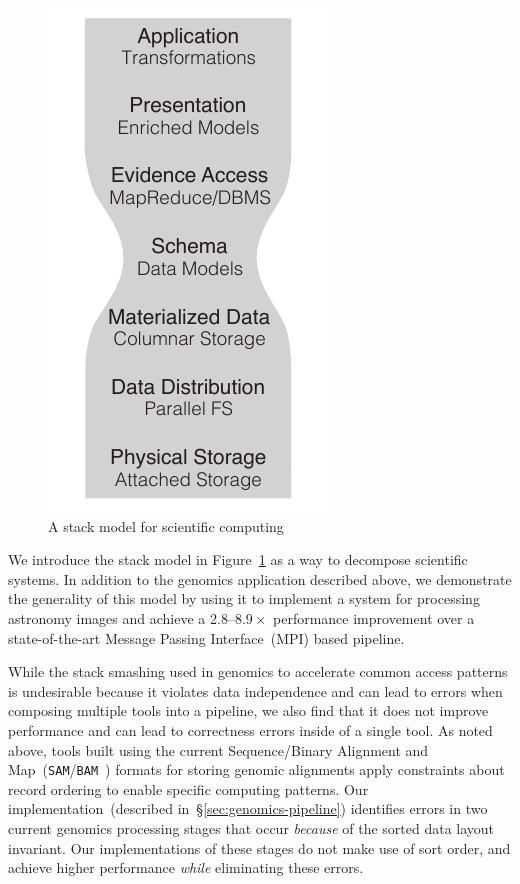 \documentclass{sig-alternate}
\begin{document}
\begin{figure}[h]
\begin{center}
\includegraphics{stack-model-2.pdf}
\end{center}
\caption{A stack model for scientific computing}
\label{fig:stack-model}
\end{figure}

We introduce the stack model in Figure~\ref{fig:stack-model} as a way to decompose scientific systems. In
addition to the genomics application described above, we demonstrate the generality of this model by using it to
implement a system for processing astronomy images and achieve a 2.8--$8.9\times$ performance
improvement over a state-of-the-art Message Passing Interface~(MPI) based pipeline.

While the stack smashing used in genomics to accelerate common access patterns is undesirable because it
violates data independence and can lead to errors when composing multiple tools into a pipeline, we also find
that it does not improve performance and can lead to correctness errors inside of a single tool. As noted
above, tools built using the current Sequence/Binary Alignment and Map~(\texttt{SAM}/\texttt{BAM}~\cite{li09}) formats
for storing genomic alignments apply constraints about record ordering to enable specific computing patterns. Our
implementation~(described in~\S\ref{sec:genomics-pipeline}) identifies errors in two current genomics
processing stages that occur \emph{because} of the sorted data layout invariant. Our implementations of
these stages do not make use of sort order, and achieve higher performance \emph{while} eliminating
these errors.
\end{document}

